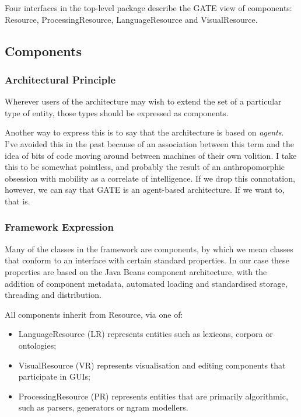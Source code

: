 Four interfaces in the top-level package describe the GATE view of
components:
Resource, ProcessingResource, LanguageResource and VisualResource.

\subsection{Components}

\label{f0:components}%

\subsubsection{Architectural Principle}


Wherever users of the architecture may wish to extend the set of a
particular type of entity, those types should be expressed as components.

Another way to express this is to say that the architecture is based on
{\em agents}. I've avoided this in the past because of an association
between this term and the idea of bits of code moving around between
machines of their own volition. I take this to be somewhat pointless, and
probably the result of an anthropomorphic obsession with mobility as a
correlate of intelligence. If we drop this connotation, however, we can
say that GATE is an agent-based architecture. If we want to, that is.

\subsubsection{Framework Expression}


Many of the classes in the framework are components, by which we mean
classes that conform to an interface with certain standard properties. In
our case these properties are based on the Java Beans component
architecture, with the addition of component metadata, automated loading
and standardised storage, threading and distribution.

All components inherit from Resource, via one of:
\begin{itemize}
\item 
LanguageResource (LR) represents entities such as lexicons, corpora or
ontologies;
\item 
VisualResource (VR) represents visualisation and editing components that
participate in GUIs;
\item 
ProcessingResource (PR) represents entities that are primarily algorithmic,
such as parsers, generators or ngram modellers.
\end{itemize}

